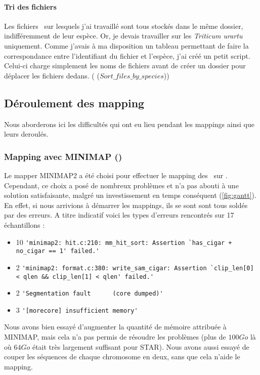 \documentclass[../main]{subfiles} %
\begin{document}
\paragraph{Tri des fichiers}
Les fichiers \fastq sur lesquels  j’ai travaillé sont tous stockés dans le même dossier, indifféremment de leur espèce. Or, je devais travailler sur les \textit{Triticum urartu} uniquement. Comme j’avais à ma disposition un tableau permettant de faire la correspondance entre l’identifiant du fichier et l’espèce, j’ai créé un petit script. Celui-ci charge simplement les noms de fichiers avant de créer un dossier pour déplacer les fichiers dedans. (\cite{florent_f-marchalm1bioinfointernship2024-inrae_agap_ge2pop_2024} ($Sort\_files\_by\_species$))


\subsection{Déroulement des \gls{mapping}}

Nous aborderons ici les difficultés qui ont eu lieu pendant les mappings ainsi que leurs deroulés.
\subsubsection{Mapping avec \gls{MINIMAP} (\GeMo)}
\label{sec:Minimap}
Le mapper MINIMAP2 a été choisi pour effectuer le \gls{mapping} des \fastq sur \GeMo. Cependant, ce choix a posé de nombreux problèmes et n'a pas abouti à une solution satisfaisante, malgré un investissement en temps conséquent (\cref{fig:gantt}). En effet, si nous arrivions à démarrer les \glspl{mapping}, ils se sont sont tous soldés par des erreurs. A titre indicatif voici les types d’erreurs rencontrés sur 17 échantillons :

\begin{itemize}
    \item  10 \lstinline{'minimap2: hit.c:210: mm_hit_sort: Assertion `has_cigar + no_cigar == 1' failed.'}
    \item 2 \lstinline{'minimap2: format.c:380: write_sam_cigar: Assertion `clip_len[0] < qlen && clip_len[1] < qlen' failed.'}
    \item 2 \lstinline{'Segmentation fault      (core dumped)'}
    \item 3 \lstinline{'[morecore] insufficient memory'}
\end{itemize}

Nous avons bien essayé d’augmenter la quantité de mémoire attribuée à \gls{MINIMAP}, mais cela n’a pas permis de résoudre les problèmes (plus de $\num{100} Go$ là où $\num{64} Go$ était très largement suffisant pour \gls{STAR}). Nous avons aussi essayé de couper les séquences de chaque chromosome en deux, sans que cela n'aide le \gls{mapping}. 
\end{document}
